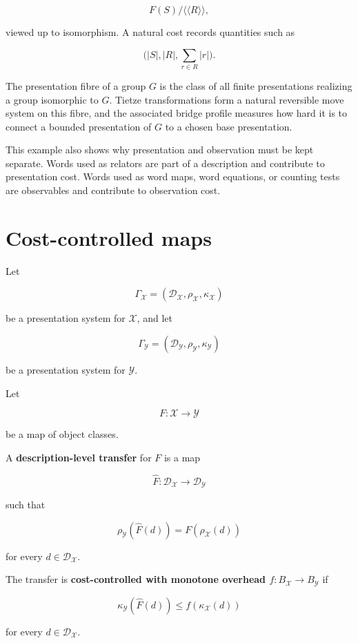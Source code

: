 \documentclass[11pt]{article}
\begin{document}
\[
F(S)/\langle\!\langle R\rangle\!\rangle,
\]

viewed up to isomorphism. A natural cost records quantities such as

\[
\bigl(|S|,|R|,\sum_{r\in R}|r|\bigr).
\]

The presentation fibre of a group \(G\) is the class of all finite presentations realizing a group isomorphic to \(G\). Tietze transformations form a natural reversible move system on this fibre, and the associated bridge profile measures how hard it is to connect a bounded presentation of \(G\) to a chosen base presentation.

This example also shows why presentation and observation must be kept separate. Words used as relators are part of a description and contribute to presentation cost. Words used as word maps, word equations, or counting tests are observables and contribute to observation cost.


\section{Cost-controlled maps}

Let

\[
\Gamma_\mathcal X=(\mathcal D_\mathcal X,\rho_\mathcal X,\kappa_\mathcal X)
\]

be a presentation system for \(\mathcal X\), and let

\[
\Gamma_\mathcal Y=(\mathcal D_\mathcal Y,\rho_\mathcal Y,\kappa_\mathcal Y)
\]

be a presentation system for \(\mathcal Y\).

Let

\[
F:\mathcal X\to\mathcal Y
\]

be a map of object classes.

A \textbf{description-level transfer} for \(F\) is a map

\[
\widehat F:\mathcal D_\mathcal X\to\mathcal D_\mathcal Y
\]

such that

\[
\rho_\mathcal Y(\widehat F(d))=F(\rho_\mathcal X(d))
\]

for every \(d\in\mathcal D_\mathcal X\).

The transfer is \textbf{cost-controlled with monotone overhead \(f:B_\mathcal X\to B_\mathcal Y\)} if

\[
\kappa_\mathcal Y(\widehat F(d))
\leq
f(\kappa_\mathcal X(d))
\]

for every \(d\in\mathcal D_\mathcal X\).
\end{document}

